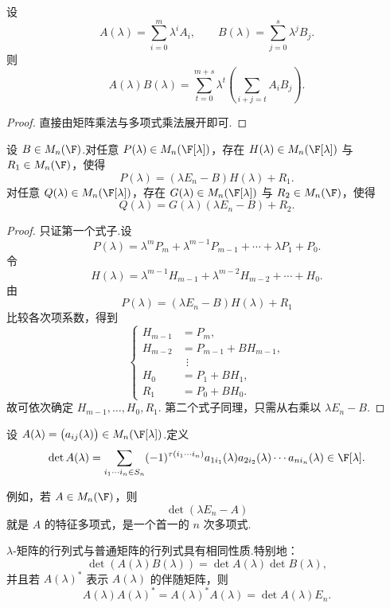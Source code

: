 \begin{lemma}
	设
	\[
	A(\lambda)=\sum_{i=0}^m\lambda^iA_i,
	\qquad
	B(\lambda)=\sum_{j=0}^s\lambda^jB_j.
	\]
	则
	\[
	A(\lambda)B(\lambda)
	=
	\sum_{t=0}^{m+s}\lambda^t
	\left(\sum_{i+j=t}A_iB_j\right).
	\]
\end{lemma}

\begin{proof}
	直接由矩阵乘法与多项式乘法展开即可.
\end{proof}

\begin{lemma}
	设 $B\in M_n(\F)$.对任意 $P(\lambda)\in M_n(\F[\lambda])$，存在 $H(\lambda)\in M_n(\F[\lambda])$ 与 $R_1\in M_n(\F)$，使得
	\[
	P(\lambda)=(\lambda E_n-B)H(\lambda)+R_1.
	\]
	对任意 $Q(\lambda)\in M_n(\F[\lambda])$，存在 $G(\lambda)\in M_n(\F[\lambda])$ 与 $R_2\in M_n(\F)$，使得
	\[
	Q(\lambda)=G(\lambda)(\lambda E_n-B)+R_2.
	\]
\end{lemma}

\begin{proof}
	只证第一个式子.设
	\[
	P(\lambda)=\lambda^mP_m+\lambda^{m-1}P_{m-1}+\cdots+\lambda P_1+P_0.
	\]
	令
	\[
	H(\lambda)=\lambda^{m-1}H_{m-1}+\lambda^{m-2}H_{m-2}+\cdots+H_0.
	\]
	由
	\[
	P(\lambda)=(\lambda E_n-B)H(\lambda)+R_1
	\]
	比较各次项系数，得到
	\[
	\left\{
	\begin{aligned}
		H_{m-1}&=P_m,\\
		H_{m-2}&=P_{m-1}+BH_{m-1},\\
		&\ \ \vdots\\
		H_0&=P_1+BH_1,\\
		R_1&=P_0+BH_0.
	\end{aligned}
	\right.
	\]
	故可依次确定 $H_{m-1},\ldots,H_0,R_1$.
	第二个式子同理，只需从右乘以 $\lambda E_n-B$.
\end{proof}


\begin{definition}
	设 $A(\lambda)=\bigl(a_{ij}(\lambda)\bigr)\in M_n(\F[\lambda])$.定义
	\[
	\det A(\lambda)
	=
	\sum_{i_1\cdots i_n\in S_n}(-1)^{\tau(i_1\cdots i_n)}
	a_{1i_1}(\lambda)a_{2i_2}(\lambda)\cdots a_{ni_n}(\lambda)
	\in\F[\lambda].
	\]
\end{definition}

例如，若 $A\in M_n(\F)$，则
\[
\det(\lambda E_n-A)
\]
就是 $A$ 的特征多项式，是一个首一的 $n$ 次多项式.

$\lambda$-矩阵的行列式与普通矩阵的行列式具有相同性质.特别地：
\[
\det(A(\lambda)B(\lambda))=\det A(\lambda)\det B(\lambda),
\]
并且若 $A(\lambda)^*$ 表示 $A(\lambda)$ 的伴随矩阵，则
\[
A(\lambda)A(\lambda)^*=A(\lambda)^*A(\lambda)=\det A(\lambda)E_n.
\]


